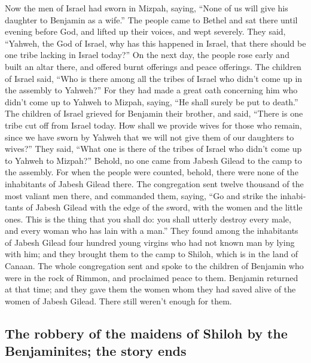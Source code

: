 \begin{paracol}{2}
\begin{otherlanguage}{english}
 Now the men of Israel had sworn in Mizpah, saying, ``None
of us will give his daughter to Benjamin as a wife.''  The
people came to Bethel and sat there until evening before God, and lifted
up their voices, and wept severely.  They said, ``Yahweh,
the God of Israel, why has this happened in Israel, that there should be
one tribe lacking in Israel today?''  On the next day, the
people rose early and built an altar there, and offered burnt offerings
and peace offerings.  The children of Israel said, ``Who
is there among all the tribes of Israel who didn't come up in the
assembly to Yahweh?'' For they had made a great oath concerning him who
didn't come up to Yahweh to Mizpah, saying, ``He shall surely be put to
death.''  The children of Israel grieved for Benjamin
their brother, and said, ``There is one tribe cut off from Israel today.
 How shall we provide wives for those who remain, since we
have sworn by Yahweh that we will not give them of our daughters to
wives?''  They said, ``What one is there of the tribes of
Israel who didn't come up to Yahweh to Mizpah?'' Behold, no one came
from Jabesh Gilead to the camp to the assembly.  For when
the people were counted, behold, there were none of the inhabitants of
Jabesh Gilead there.  The congregation sent twelve
thousand of the most valiant men there, and commanded them, saying, ``Go
and strike the inhabitants of Jabesh Gilead with the edge of the sword,
with the women and the little ones.  This is the thing
that you shall do: you shall utterly destroy every male, and every woman
who has lain with a man.''  They found among the
inhabitants of Jabesh Gilead four hundred young virgins who had not
known man by lying with him; and they brought them to the camp to
Shiloh, which is in the land of Canaan.  The whole
congregation sent and spoke to the children of Benjamin who were in the
rock of Rimmon, and proclaimed peace to them.  Benjamin
returned at that time; and they gave them the women whom they had saved
alive of the women of Jabesh Gilead. There still weren't enough for
them.

\hypertarget{the-robbery-of-the-maidens-of-shiloh-by-the-benjaminites-the-story-ends}{%
\subsection{The robbery of the maidens of Shiloh by the Benjaminites;
the story
ends}\label{the-robbery-of-the-maidens-of-shiloh-by-the-benjaminites-the-story-ends}}


\end{otherlanguage}
\end{paracol}
